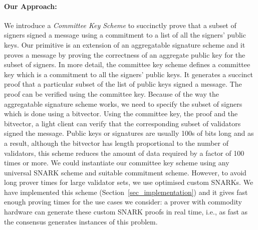 \paragraph{Our Approach:} We introduce a {\em Committee Key Scheme} to succinctly prove that a subset of signers
signed a message using a commitment to a list of all the signers' public keys. Our primitive is an extension of an aggregatable signature scheme and it proves a message by proving the correctness of an aggregate public key for the subset of signers.
In more detail, the committee key scheme defines a committee key which is a commitment to all the signers' public keys. It generates a succinct proof that a particular subset of the list of public keys signed a message. The proof can be verified using the committee key.
Because of the way the aggregatable signature scheme works, we need to specify the subset of signers which is done using a bitvector.
Using the committee key, the proof and the bitvector, a light client can verify that the corresponding subset of validators signed the message.
 Public keys or signatures are usually 100s of bits long and as a result, although the bitvector has length proportional to the number of validators, this scheme reduces the amount of
data required by a factor of 100 times or more. We could instantiate our committee key scheme using any universal SNARK scheme and suitable commitment scheme.
However, to avoid long prover times for large validator sets, we use optimised custom SNARKs. We have implemented this scheme
(Section~\ref{sec_implementation}) and it gives fast enough proving times for the use cases we consider: a prover with
commodity hardware can generate these custom SNARK proofs in real time, i.e., as fast as the consensus generates instances of this problem.

\vspace{-0.2cm}
